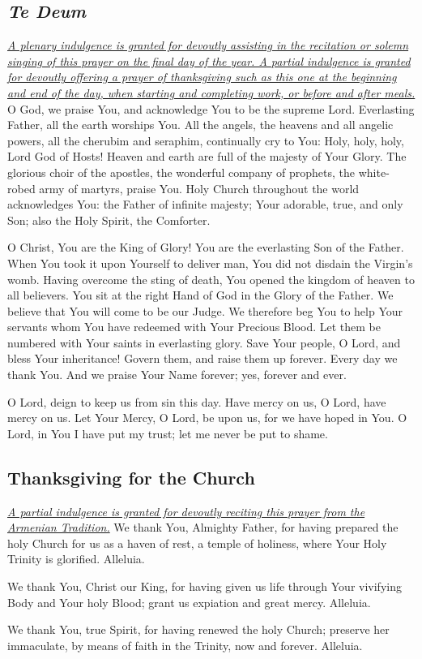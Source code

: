 \documentclass[12pt]{article}
\newcommand{\prayertitle}[1]{\subsection{#1}}
\newcommand{\indulgencedprayertitle}[1]{\prayertitle{#1 \protect\kreuz}}
\newcommand{\emphasis}[1]{\emph{#1}}
\newcommand{\emphasis}[1]{\textsl{#1}}
\newcommand{\foreign}[1]{\emphasis{#1}}
\newcommand{\note}[1]{{\small{\emphasis{#1}}}\newline}
\newcommand{\linkednote}[2]{\hyperlink{#1}{\note{#2}}}
\begin{document}
\indulgencedprayertitle{\foreign{Te Deum}}
\linkednote{grant26}{A plenary indulgence is granted for devoutly assisting in the recitation or solemn singing of this prayer on the final day of the year.
A partial indulgence is granted for devoutly offering a prayer of thanksgiving such as this one at the beginning and end of the day, when starting and completing work, or before and after meals.}
O God, we praise You, and acknowledge You to be the supreme Lord.
Everlasting Father, all the earth worships You.
All the angels, the heavens and all angelic powers, all the cherubim and seraphim, continually cry to You:
Holy, holy, holy, Lord God of Hosts!
Heaven and earth are full of the majesty of Your Glory.
The glorious choir of the apostles, the wonderful company of prophets, the white-robed army of martyrs, praise You.
Holy Church throughout the world acknowledges You:
the Father of infinite majesty;
Your adorable, true, and only Son;
also the Holy Spirit, the Comforter.

O Christ, You are the King of Glory!
You are the everlasting Son of the Father.
When You took it upon Yourself to deliver man, You did not disdain the Virgin's womb.
Having overcome the sting of death, You opened the kingdom of heaven to all believers.
You sit at the right Hand of God in the Glory of the Father.
We believe that You will come to be our Judge.
We therefore beg You to help Your servants whom You have redeemed with Your Precious Blood.
Let them be numbered with Your saints in everlasting glory.
Save Your people, O Lord, and bless Your inheritance!
Govern them, and raise them up forever.
Every day we thank You.
And we praise Your Name forever;
yes, forever and ever.

O Lord, deign to keep us from sin this day.
Have mercy on us, O Lord, have mercy on us.
Let Your Mercy, O Lord, be upon us, for we have hoped in You.
O Lord, in You I have put my trust;
let me never be put to shame.
\newpage
\indulgencedprayertitle{Thanksgiving for the Church}
\linkednote{grant23}{A partial indulgence is granted for devoutly reciting this prayer from the Armenian Tradition.}
We thank You, Almighty Father, for having prepared the holy Church for us as a haven
of rest, a temple of holiness, where Your Holy Trinity is glorified. Alleluia.

We thank You, Christ our King, for having given us life through Your vivifying Body
and Your holy Blood; grant us expiation and great mercy. Alleluia.

We thank You, true Spirit, for having renewed the holy Church; preserve her immaculate, by means of faith in the Trinity, now and forever. Alleluia.
\end{document}
